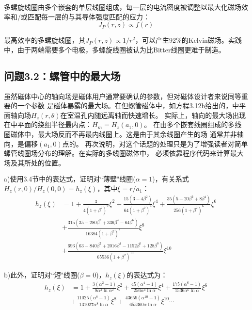 多螺旋线圈由多个嵌套的单层线圈组成，每一层的电流密度被调整以最大化磁场效率和/或匹配每一层的与其导体强度匹配的应力：
\begin{equation*}
J_P(r,z)\propto f(r)%
\end{equation*}

最高效率的多螺旋线圈，其$J_P(r,z)\propto 1/r^2$，可以产生92\%的Kelvin磁场。实践中，由于两端需要多个电极，多螺旋线圈被认为比Bitter线圈更难于制造。


\subsection{问题3.2：螺管中的最大场}
虽然磁体中心的轴向场是磁体用户通常要确认的参数，但对磁体设计者来说同等重要的一个参数
是磁体暴露的最大场。在但螺管磁体中，如方程3.12b给出的，中平面轴向场$H_z(r,
\theta)$在室温孔内随远离轴而快速增长。
实际上，轴向的最大场出现在中平面的绕组半径最内点：$H_m=H_z(a_1,0)$。
在由多个嵌套线圈组成的多线圈磁体中，最大场反而不再最内线圈上。这是由于其余线圈产生的场
通常并非轴向，是偏移$(a_1,0)$点的。
再次说明，对这个话题的处理只是为了增强读者对简单螺管线圈场分布的理解。在实际的多线圈磁体中，
必须依靠程序代码来计算最大场及其所处的位置。

a)使用3.4节中的表达式，证明对``薄壁"线圈($\alpha=1$)，有关系式$H_z(r,0)/H_z(0,0)=h_z(\xi)$，其中$\xi=r/a_1$：
\begin{equation}
\begin{split}
h_z(\xi)&=1+\frac{3}{4(1+\beta^2)^2}\xi^2+\frac{15(3-4\beta^2)}{64(1+\beta^2)^4}\xi^4+\frac{35(5-20\beta^2+8\beta^4)}{256(1+\beta^2)^6}\xi^6\\
&+\frac{315(35-280\beta^2+336\beta^4-64\beta^6)}{16384(1+\beta^2)^8}\xi^8\\
&+\frac{693(63-840\beta^2+2016\beta^4-1152\beta^6+128\beta^8)}{65536(1+\beta^2)^{10}}\xi^{10}%
\end{split}
\end{equation}

b)此外，证明对``短"线圈($\beta=0$)，$h_z(\xi)$的表达式为：
\begin{equation*}
\begin{split}
h_z(\xi)&=1+\frac{3(\alpha^2-1)}{8\alpha^2\ln\alpha^2}\xi^2+\frac{45(\alpha^4-1)}{256\alpha^4\ln\alpha}\xi^4+\frac{175(\alpha^6-1)}{1536\alpha^6\ln\alpha}\xi^6\\
&+\frac{11025(\alpha^8-1)}{131027\alpha^8\ln\alpha}\xi^8+\frac{43659(\alpha^10-1)}{655360\alpha\ln\alpha}\xi^{10}\cdots%
\end{split}\tag{3.117b}
\end{equation*}

